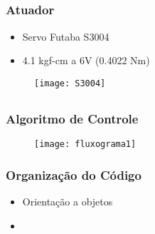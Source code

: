\documentclass{beamer}
\begin{document}
\subsection{}
\begin{frame}
  \frametitle{Atuador}
  \begin{itemize}
    \item Servo Futaba S3004
    \item 4.1 kgf-cm a 6V (0.4022 Nm)
  \end{itemize}
\begin{figure}[ht]
 \begin{center}
  \texttt{[image: S3004]}
 \end{center}
\end{figure}
\end{frame}

\subsection{}
\begin{frame}
\begin{figure}
 \centering
   \hfil
   \hfil
\end{figure}
\end{frame}



\subsection{}
\begin{frame}
 \frametitle{Algoritmo de Controle}
\end{frame}

\begin{frame}[plain]
  \begin{figure}
    \begin{center}
      \texttt{[image: fluxograma1]}
    \end{center}
  \end{figure}
\end{frame}

\begin{frame}
  \frametitle{Organização do Código}
  \begin{itemize}
    \item Orientação a objetos
    \item 
  \end{itemize}

\end{frame}
\end{document}

